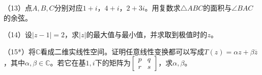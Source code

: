 \begin{exercise}
（13）点\(A , B , C\)分别对应\(1 + i\)，\(4 + i\)，\(2 + 3 i\)。用复数求\(\triangle A B C\)的面积与\(\angle B A C\)的余弦。

（14）设\(\left| z - 1 \right| = 2\)，求\(\left| z \right|\)的最大值与最小值，并求取到极值时的\(z\)。

（15*）将\(\mathbb{C}\)看成二维实线性空间。证明任意线性变换都可以写成\(T \left( z \right) = \alpha z + \beta \overline{z}\)，其中\(\alpha , \beta \in \mathbb{C}\)。若它在基\(1 , i\)下的矩阵为\(\left[ \begin{smallmatrix}p & q \\ r & s\end{smallmatrix} \right]\)，求\(\alpha , \beta\)。
\end{exercise}
\newpage
